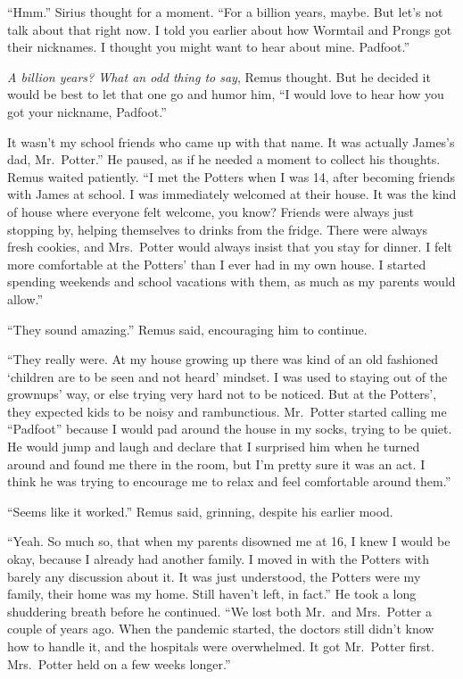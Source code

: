 \documentclass[12pt,twoside,openright]{memoir}
\begin{document}
``Hmm.'' Sirius thought for a moment. ``For a billion years, maybe. But let's not talk about that right now. I told you earlier about how Wormtail and Prongs got their nicknames. I thought you might want to hear about mine. Padfoot.''

\textit{A billion years? What an odd thing to say}, Remus thought. But he decided it would be best to let that one go and humor him, ``I would love to hear how you got your nickname, Padfoot.''

{\textquotedbl}It wasn't my school friends who came up with that name. It was actually James's dad, Mr.\ Potter.'' He paused, as if he needed a moment to collect his thoughts. Remus waited patiently. ``I met the Potters when I was 14, after becoming friends with James at school. I was immediately welcomed at their house. It was the kind of house where everyone felt welcome, you know? Friends were always just stopping by, helping themselves to drinks from the fridge. There were always fresh cookies, and Mrs.\ Potter would always insist that you stay for dinner. I felt more comfortable at the Potters' than I ever had in my own house. I started spending weekends and school vacations with them, as much as my parents would allow.'' 

``They sound amazing.'' Remus said, encouraging him to continue.

``They really were. At my house growing up there was kind of an old fashioned `children are to be seen and not heard' mindset. I was used to staying out of the grownups' way, or else trying very hard not to be noticed. But at the Potters', they expected kids to be noisy and rambunctious. Mr.\ Potter started calling me ``Padfoot'' because I would pad around the house in my socks, trying to be quiet. He would jump and laugh and declare that I surprised him when he turned around and found me there in the room, but I'm pretty sure it was an act. I think he was trying to encourage me to relax and feel comfortable around them.''

``Seems like it worked.'' Remus said, grinning, despite his earlier mood.

``Yeah. So much so, that when my parents disowned me at 16, I knew I would be okay, because I already had another family. I moved in with the Potters with barely any discussion about it. It was just understood, the Potters were my family, their home was my home. Still haven't left, in fact.'' He took a long shuddering breath before he continued. ``We lost both Mr.\ and Mrs.\ Potter a couple of years ago. When the pandemic started, the doctors still didn't know how to handle it, and the hospitals were overwhelmed. It got Mr.\ Potter first. Mrs.\ Potter held on a few weeks longer.'' 
\end{document}
